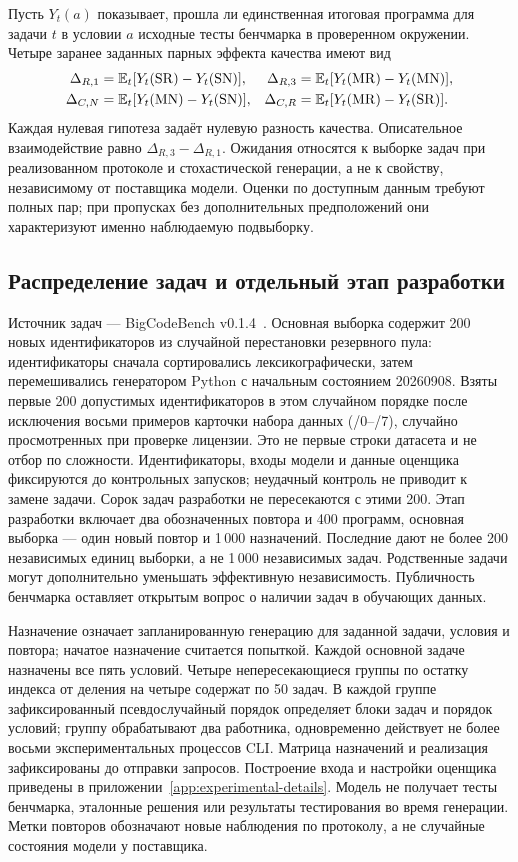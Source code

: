Пусть $Y_t(a)$ показывает, прошла ли единственная итоговая программа для задачи $t$ в условии $a$ исходные тесты бенчмарка в проверенном окружении. Четыре заранее заданных парных эффекта качества имеют вид
\begin{align}
\Delta_{R,1}&=\mathbb{E}_t[Y_t(\mathrm{SR})-Y_t(\mathrm{SN})], &
\Delta_{R,3}&=\mathbb{E}_t[Y_t(\mathrm{MR})-Y_t(\mathrm{MN})],\\
\Delta_{C,N}&=\mathbb{E}_t[Y_t(\mathrm{MN})-Y_t(\mathrm{SN})], &
\Delta_{C,R}&=\mathbb{E}_t[Y_t(\mathrm{MR})-Y_t(\mathrm{SR})].
\end{align}
Каждая нулевая гипотеза задаёт нулевую разность качества. Описательное взаимодействие равно $\Delta_{R,3}-\Delta_{R,1}$. Ожидания относятся к выборке задач при реализованном протоколе и стохастической генерации, а не к свойству, независимому от поставщика модели. Оценки по доступным данным требуют полных пар; при пропусках без дополнительных предположений они характеризуют именно наблюдаемую подвыборку.

\subsection{Распределение задач и отдельный этап разработки}
Источник задач --- BigCodeBench v0.1.4~\cite{zhuo2024bigcodebench}. Основная выборка содержит 200 новых идентификаторов из случайной перестановки резервного пула: идентификаторы сначала сортировались лексикографически, затем перемешивались генератором Python с начальным состоянием 20260908. Взяты первые 200 допустимых идентификаторов в этом случайном порядке после исключения восьми примеров карточки набора данных (/0--/7), случайно просмотренных при проверке лицензии. Это не первые строки датасета и не отбор по сложности. Идентификаторы, входы модели и данные оценщика фиксируются до контрольных запусков; неудачный контроль не приводит к замене задачи. Сорок задач разработки не пересекаются с этими 200. Этап разработки включает два обозначенных повтора и 400 программ, основная выборка --- один новый повтор и 1\,000 назначений. Последние дают не более 200 независимых единиц выборки, а не 1\,000 независимых задач. Родственные задачи могут дополнительно уменьшать эффективную независимость. Публичность бенчмарка оставляет открытым вопрос о наличии задач в обучающих данных.

Назначение означает запланированную генерацию для заданной задачи, условия и повтора; начатое назначение считается попыткой. Каждой основной задаче назначены все пять условий. Четыре непересекающиеся группы по остатку индекса от деления на четыре содержат по 50 задач. В каждой группе зафиксированный псевдослучайный порядок определяет блоки задач и порядок условий; группу обрабатывают два работника, одновременно действует не более восьми экспериментальных процессов CLI. Матрица назначений и реализация зафиксированы до отправки запросов. Построение входа и настройки оценщика приведены в приложении~\ref{app:experimental-details}. Модель не получает тесты бенчмарка, эталонные решения или результаты тестирования во время генерации. Метки повторов обозначают новые наблюдения по протоколу, а не случайные состояния модели у поставщика.

